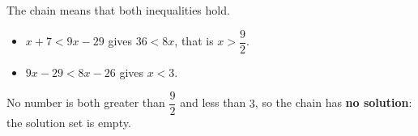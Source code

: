 The chain means that both inequalities hold.
\begin{itemize}
\item $x+7<9x-29$ gives $36<8x$, that is $x>\dfrac{9}{2}$.
\item $9x-29<8x-26$ gives $x<3$.
\end{itemize}
No number is both greater than $\dfrac{9}{2}$ and less than $3$, so the chain has \textbf{no solution}: the solution set is empty.
